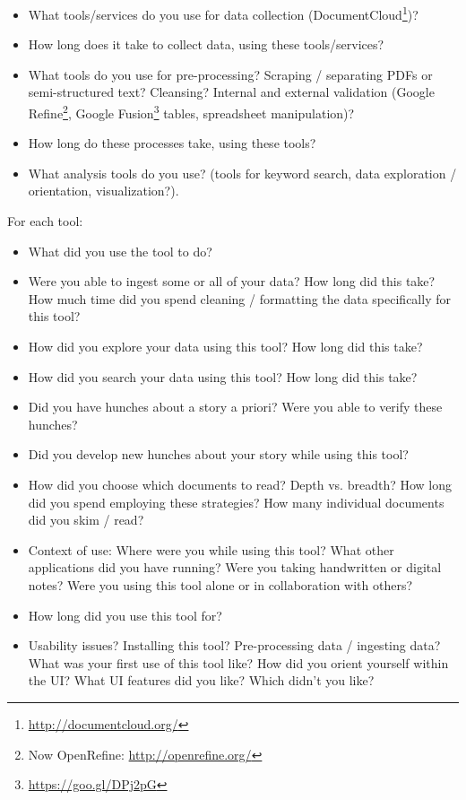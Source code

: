 \begin{itemize}
    \item What tools/services do you use for data collection (\eg DocumentCloud\footnote{\url{http://documentcloud.org/}})?
    \item How long does it take to collect data, using these tools/services?
    \item What tools do you use for pre-processing? Scraping / separating PDFs or semi-structured text? Cleansing? Internal and external validation (\eg Google Refine\footnote{Now OpenRefine: \url{http://openrefine.org/}}, Google Fusion\footnote{\url{https://goo.gl/DPj2pG}} tables, spreadsheet manipulation)?
    \item How long do these processes take, using these tools?
    \item What analysis tools do you use? (\eg tools for keyword search, data exploration / orientation, visualization?). 
\end{itemize}

For each tool:

\begin{itemize}
    \item What did you use the tool to do?
    \item Were you able to ingest some or all of your data? How long did this take? How much time did you spend cleaning / formatting the data specifically for this tool?
    \item How did you explore your data using this tool? How long did this take?
    \item How did you search your data using this tool? How long did this take?
    \item Did you have hunches about a story a priori? Were you able to verify these hunches? 
    \item Did you develop new hunches about your story while using this tool?
    \item How did you choose which documents to read? Depth vs. breadth? How long did you spend employing these strategies? How many individual documents did you skim / read?
    \item Context of use: Where were you while using this tool? What other applications did you have running? Were you taking handwritten or digital notes? Were you using this tool alone or in collaboration with others?
    \item How long did you use this tool for?
    \item Usability issues? Installing this tool? Pre-processing data / ingesting data? What was your first use of this tool like? How did you orient yourself within the \ac{UI}? What \ac{UI} features did you like? Which didn't you like?
\end{itemize}

